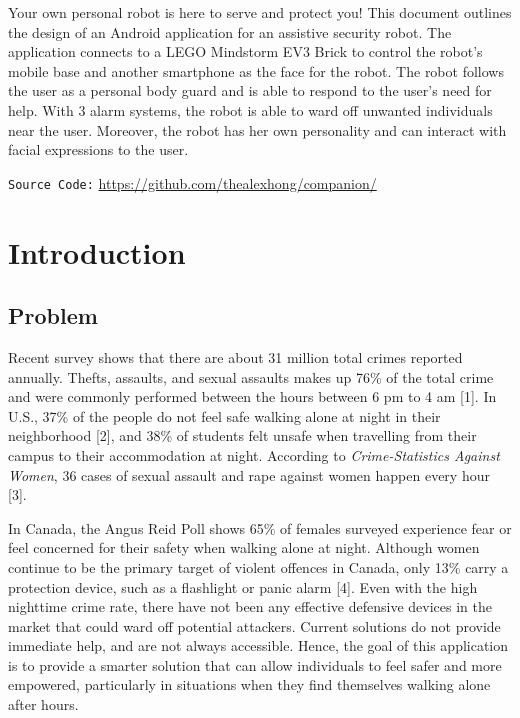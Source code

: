 \documentclass[12pt]{article}
\begin{document}

\pagebreak
\tableofcontents
\pagebreak

\vspace*{\fill}
\renewcommand{\abstractname}{Executive Summary}
\abstract
Your own personal robot is here to serve and protect you! This document outlines the design of an Android application for an assistive security robot. The application connects to a LEGO Mindstorm EV3 Brick to control the robot's mobile base and another smartphone as the face for the robot. The robot follows the user as a personal body guard and is able to respond to the user's need for help. With 3 alarm systems, the robot is able to ward off unwanted individuals near the user. Moreover, the robot has her own personality and can interact with facial expressions to the user.
\vfill
\begin{center}
\texttt{Source Code:} \url{https://github.com/thealexhong/companion/}
\end{center}
\vspace*{\fill}
\pagebreak

\section{Introduction}
\subsection{Problem}
Recent survey shows that there are about 31 million total crimes reported annually. Thefts, assaults, and sexual assaults makes up 76\% of the total crime and were commonly performed between the hours between 6 pm to 4 am [1]. In U.S., 37\% of the people do not feel safe walking alone at night in their neighborhood [2], and 38\% of students felt unsafe when travelling from their campus to their accommodation at night. According to \textit{Crime-Statistics Against Women}, 36 cases of sexual assault and rape against women happen every hour [3]. 

In Canada, the Angus Reid Poll shows 65\% of females surveyed experience fear or feel concerned for their safety when walking alone at night. Although women continue to be the primary target of violent offences in Canada, only 13\% carry a protection device, such as a flashlight or panic alarm [4]. Even with the high nighttime crime rate, there have not been any effective defensive devices in the market that could ward off potential attackers. Current solutions do not provide immediate help, and are not always accessible. Hence, the goal of this application is to provide a smarter solution that can allow individuals to feel safer and more empowered, particularly in situations when they find themselves walking alone after hours.
\end{document}

